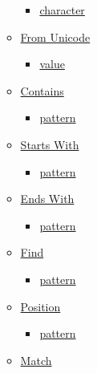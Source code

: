 \begin{itemize}
\begin{itemize}
    \begin{itemize}
    \tightlist
    \item
      \hyperref[definitions-to-unicode-character]{character}
    \end{itemize}
  \item
    \hyperref[definitions-from-unicode]{From Unicode}

    \begin{itemize}
    \tightlist
    \item
      \hyperref[definitions-from-unicode-value]{value}
    \end{itemize}
  \item
    \hyperref[definitions-contains]{Contains}

    \begin{itemize}
    \tightlist
    \item
      \hyperref[definitions-contains-pattern]{pattern}
    \end{itemize}
  \item
    \hyperref[definitions-starts-with]{Starts With}

    \begin{itemize}
    \tightlist
    \item
      \hyperref[definitions-starts-with-pattern]{pattern}
    \end{itemize}
  \item
    \hyperref[definitions-ends-with]{Ends With}

    \begin{itemize}
    \tightlist
    \item
      \hyperref[definitions-ends-with-pattern]{pattern}
    \end{itemize}
  \item
    \hyperref[definitions-find]{Find}

    \begin{itemize}
    \tightlist
    \item
      \hyperref[definitions-find-pattern]{pattern}
    \end{itemize}
  \item
    \hyperref[definitions-position]{Position}

    \begin{itemize}
    \tightlist
    \item
      \hyperref[definitions-position-pattern]{pattern}
    \end{itemize}
  \item
    \hyperref[definitions-match]{Match}


\end{itemize}
\end{itemize}
